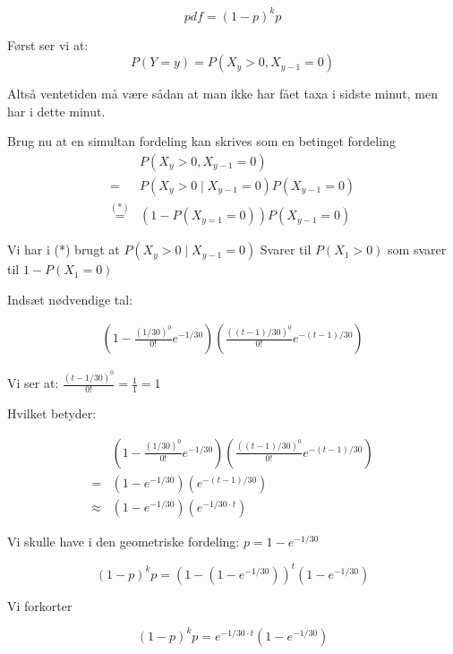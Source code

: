 \begin{equation}
    pdf = (1-p)^k p
\end{equation}

Først ser vi at:
\begin{equation}
    P(Y = y) = P(X_y > 0, X_{y-1} = 0)
\end{equation}

Altså ventetiden må være sådan at man ikke har fået taxa i sidste minut, men har i dette minut.

Brug nu at en simultan fordeling kan skrives som en betinget fordeling
\begin{align}
    &P(X_y > 0, X_{y-1} = 0) \\
    = &P(X_y > 0 \mid X_{y - 1} = 0)P(X_{y - 1}=0) \\
    \overset{(*)}{=} &(1 - P(X_{y=1}=0))P(X_{y-1}=0)
\end{align}

Vi har i (*) brugt at $P(X_{y} > 0 \mid X_{y - 1}= 0)$ Svarer til $ P(X_{1} > 0)$ som svarer til $1 - P(X_{1} = 0)$

Indsæt nødvendige tal:

\begin{align}
    \left(1 -  \frac{(1/30)^0}{0!}e^{-1/30}\right)\left(\frac{((t - 1)/30)^0}{0!}e^{-(t - 1)/30} \right)    
\end{align}

Vi ser at: $ \frac{(t - 1/30)^0}{0!} = \frac{1}{1} =  1$

Hvilket betyder:

\begin{align}
    &\left(1 -  \frac{(1/30)^0}{0!}e^{-1/30}\right)\left(\frac{((t - 1)/30)^0}{0!}e^{-(t - 1)/30} \right)    \\
    = &\left(1 -  e^{-1/30}\right)\left(e^{-(t-1)/30} \right) \\
    \approx & \left(1 -  e^{-1/30}\right)\left(e^{-1/30\cdot t} \right)
\end{align}

Vi skulle have i den geometriske fordeling: $p = 1 - e^{-1/30}$

\begin{equation}
    (1-p)^k p = (1 - (1 - e^{-1/30}))^t (1 - e^{-1/30})
\end{equation}

Vi forkorter

\begin{equation}
    (1-p)^k p = e^{-1/30\cdot t} (1 - e^{-1/30})
\end{equation}

